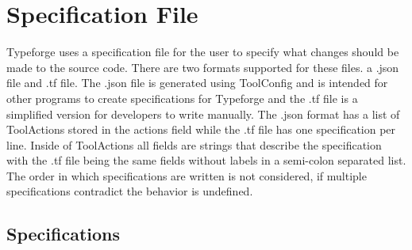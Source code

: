\documentclass[natbib]{article}
\begin{document}
\section{Specification File}
Typeforge uses a specification file for the user to specify what changes should be 
made to the source code. There are two formats supported for these files. a .json 
file and .tf file. The .json file is generated using ToolConfig and is intended 
for other programs to create specifications for Typeforge and the .tf file is a 
simplified version for developers to write manually. The .json format has a list 
of ToolActions stored in the actions field while the .tf file has one specification 
per line. Inside of ToolActions all fields are strings that describe the specification 
with the .tf file being the same fields without labels in a semi-colon separated list. 
The order in which specifications are written is not considered, if multiple 
specifications contradict the behavior is undefined. 

\subsection{Specifications}
\end{document}
